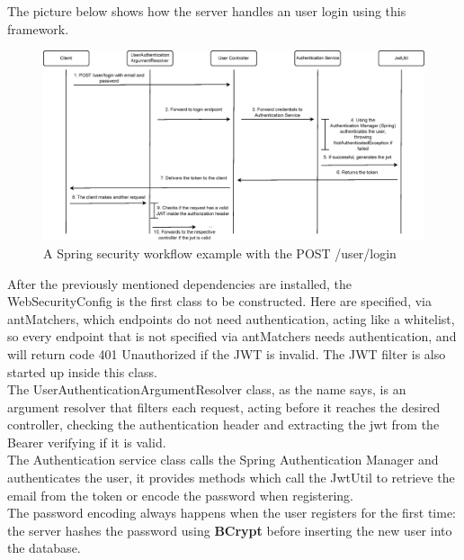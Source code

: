 The picture below shows how the server handles an user login using this framework.\\

\newpage
\begin{figure}[H]
    \begin{center}
        \includegraphics[scale=0.60]{_figures/Spring-jwt-diagram.eps}
        \caption{A Spring security workflow example with the POST /user/login}
    \end{center}
\end{figure}

After the previously mentioned dependencies are installed, the WebSecurityConfig is the first class to be constructed. Here are specified, via antMatchers, which
endpoints do not need authentication, acting like a whitelist, so every endpoint that is not specified via antMatchers needs authentication, and will return code 401
Unauthorized if the JWT is invalid. The JWT filter is also started up inside this class.\\

The UserAuthenticationArgumentResolver class, as the name says, is an argument resolver that filters each request, acting before it reaches the desired controller,
checking the authentication header and extracting the jwt from the Bearer verifying if it is valid.\\

The Authentication service class calls the Spring Authentication Manager and authenticates the user, it provides methods which call the JwtUtil
to retrieve the email from the token or encode the password when registering.\\

The password encoding always happens when the user registers for the first time: the server hashes the password using \textbf{BCrypt}\cite{bcrypt} before inserting the new
user into the database.\\

